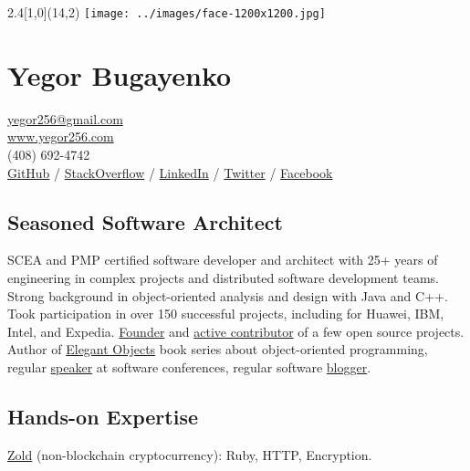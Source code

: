 \documentclass[12pt]{article}
\begin{document}
\setlength{\topskip}{0mm}
\setlength{\parindent}{0pt}
\setlength{\parskip}{4pt}
\raggedright
{}

\begin{textblock}{2.4}[1,0](14,2){
  \texttt{[image: ../images/face-1200x1200.jpg]}
}\end{textblock}

\section*{Yegor Bugayenko}

\href{mailto:yegor256@gmail.com}{yegor256@gmail.com}\\%
\href{https://www.yegor256.com}{www.yegor256.com}\\%
(408) 692-4742\\%
\href{https://github.com/yegor256}{GitHub} /
\href{https://stackexchange.com/users/63162/yegor256}{StackOverflow} /
\href{https://www.linkedin.com/in/yegor256}{LinkedIn} /
\href{https://twitter.com/intent/follow?screen_name=yegor256}{Twitter} /
\href{https://www.facebook.com/yegor256}{Facebook}

\subsection*{Seasoned Software Architect}

SCEA and PMP certified software developer and architect with
25+ years of engineering in complex projects and distributed software
development teams. Strong background in object-oriented analysis and design
with Java and C++. Took participation in over 150 successful projects,
including for Huawei, IBM, Intel, and Expedia. \href{https://www.yegor256.com/pets.html}{Founder}
and \href{https://github.com/yegor256}{active contributor} of
a few open source projects. Author of
\href{https://www.yegor256.com/elegant-objects.html}{Elegant Objects}
book series about object-oriented programming,
regular \href{https://www.yegor256.com/talks.html}{speaker} at software conferences, regular software
\href{https://www.yegor256.com}{blogger}.

\subsection*{Hands-on Expertise}

\href{https://www.zold.io}{Zold} (non-blockchain cryptocurrency):
Ruby, HTTP, Encryption.
\end{document}
